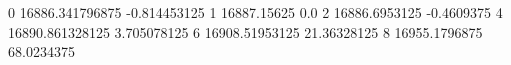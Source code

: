0 16886.341796875 -0.814453125
1 16887.15625 0.0
2 16886.6953125 -0.4609375
4 16890.861328125 3.705078125
6 16908.51953125 21.36328125
8 16955.1796875 68.0234375
